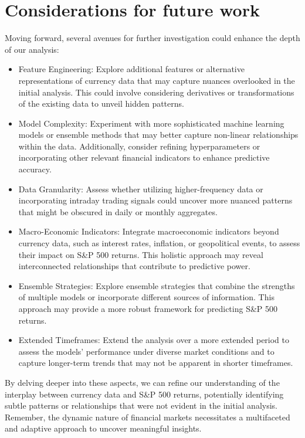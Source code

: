 \section{Considerations for future work}
\label{Considerations for future work}
Moving forward, several avenues for further investigation could enhance the depth of our analysis:

\begin{itemize}
    \item Feature Engineering: Explore additional features or alternative representations of currency data that may capture nuances overlooked in the initial analysis. This could involve considering derivatives or transformations of the existing data to unveil hidden patterns.
    \item Model Complexity: Experiment with more sophisticated machine learning models or ensemble methods that may better capture non-linear relationships within the data. Additionally, consider refining hyperparameters or incorporating other relevant financial indicators to enhance predictive accuracy.
    \item Data Granularity: Assess whether utilizing higher-frequency data or incorporating intraday trading signals could uncover more nuanced patterns that might be obscured in daily or monthly aggregates.
    \item Macro-Economic Indicators: Integrate macroeconomic indicators beyond currency data, such as interest rates, inflation, or geopolitical events, to assess their impact on S\&P 500 returns. This holistic approach may reveal interconnected relationships that contribute to predictive power.
    \item Ensemble Strategies: Explore ensemble strategies that combine the strengths of multiple models or incorporate different sources of information. This approach may provide a more robust framework for predicting S\&P 500 returns.
    \item Extended Timeframes: Extend the analysis over a more extended period to assess the models' performance under diverse market conditions and to capture longer-term trends that may not be apparent in shorter timeframes.
\end{itemize}

By delving deeper into these aspects, we can refine our understanding of the interplay between currency data and S\&P 500 returns, potentially identifying subtle patterns or relationships that were not evident in the initial analysis. Remember, the dynamic nature of financial markets necessitates a multifaceted and adaptive approach to uncover meaningful insights.


